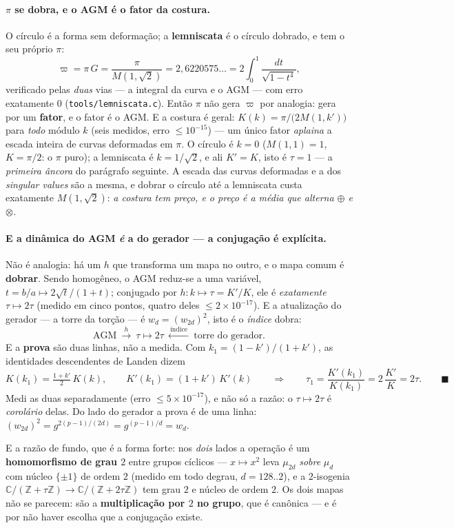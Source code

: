 \documentclass[11pt]{article}
\newcommand{\code}[1]{\texttt{\small #1}}
\newcommand{\Z}{\mathbb Z}
\theoremstyle{plain}
\theoremstyle{remark}
\begin{document}
\paragraph{$\pi$ se dobra, e o AGM é o fator da costura.} O círculo é a forma sem deformação; a
\textbf{lemniscata} é o círculo dobrado, e tem o seu próprio $\pi$:
\[
 \varpi=\pi\,G=\frac{\pi}{M(1,\sqrt2)}=2{,}6220575\ldots=2\!\int_0^1\!\frac{dt}{\sqrt{1-t^4}},
\]
verificado pelas \emph{duas} vias --- a integral da curva e o AGM --- com erro exatamente $0$
(\code{tools/lemniscata.c}). Então $\pi$ não gera $\varpi$ por analogia: gera por um \textbf{fator}, e o
fator é o AGM. E a costura é geral: $K(k)=\pi/\bigl(2M(1,k')\bigr)$ para \emph{todo} módulo $k$ (seis
medidos, erro $\le10^{-15}$) --- um único fator \emph{aplaina} a escada inteira de curvas deformadas em
$\pi$. O círculo é $k=0$ ($M(1,1)=1$, $K=\pi/2$: o $\pi$ puro); a lemniscata é $k=1/\sqrt2$, e ali
$K'=K$, isto é $\tau=1$ --- a \emph{primeira âncora} do parágrafo seguinte. A escada das curvas
deformadas e a dos \emph{singular values} são a mesma, e dobrar o círculo até a lemniscata custa
exatamente $M(1,\sqrt2)$: \emph{a costura tem preço, e o preço é a média que alterna $\oplus$ e
$\otimes$.}

\paragraph{E a dinâmica do AGM \emph{é} a do gerador --- a conjugação é explícita.} Não é analogia: há
um $h$ que transforma um mapa no outro, e o mapa comum é \textbf{dobrar}. Sendo homogêneo, o AGM reduz-se
a uma variável, $t=b/a\mapsto 2\sqrt t/(1+t)$; conjugado por $h:k\mapsto\tau=K'/K$, ele é
\emph{exatamente} $\tau\mapsto2\tau$ (medido em cinco pontos, quatro deles $\le2\times10^{-17}$). E a
atualização do gerador --- a torre da torção --- é $w_d=(w_{2d})^2$, isto é o \emph{índice} dobra:
\[
 \text{AGM}\ \xrightarrow{\ h\ }\ \tau\mapsto2\tau\ \xleftarrow{\ \text{índice}\ }\ \text{torre do gerador}.
\]
E a \textbf{prova} são duas linhas, não a medida. Com $k_1=(1-k')/(1+k')$, as identidades
descendentes de Landen dizem
\[
 K(k_1)=\tfrac{1+k'}{2}\,K(k),\qquad K'(k_1)=(1+k')\,K'(k)
 \qquad\Longrightarrow\qquad \tau_1=\frac{K'(k_1)}{K(k_1)}=2\,\frac{K'}{K}=2\tau. \qquad\blacksquare
\]
Medi as duas separadamente (erro $\le5\times10^{-17}$), e não só a razão: o $\tau\mapsto2\tau$ é
\emph{corolário} delas. Do lado do gerador a prova é de uma linha:
$(w_{2d})^2=g^{2(p-1)/(2d)}=g^{(p-1)/d}=w_d$.

E a razão de fundo, que é a forma forte: nos \emph{dois} lados a operação é um \textbf{homomorfismo de
grau $2$} entre grupos cíclicos --- $x\mapsto x^2$ leva $\mu_{2d}$ \emph{sobre} $\mu_d$ com núcleo
$\{\pm1\}$ de ordem $2$ (medido em todo degrau, $d=128..2$), e a $2$-isogenia
$\mathbb C/(\Z+\tau\Z)\to\mathbb C/(\Z+2\tau\Z)$ tem grau $2$ e núcleo de ordem $2$. Os dois mapas não
se parecem: são a \textbf{multiplicação por $2$ no grupo}, que é canônica --- e é por não haver escolha
que a conjugação existe.
\end{document}
